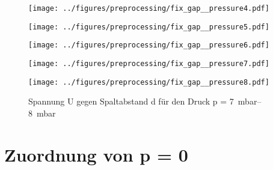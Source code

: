 \begin{figure}[htbp]
    \begin{minipage}[t]{0.3\textwidth}
        \centering
        \texttt{[image: ../figures/preprocessing/fix\_gap\_\_pressure4.pdf]}
        \caption{Spannung U gegen Spaltabstand d für den Druck p = \SIrange{3}{4}{\milli\bar}}
        \label{fig:fix_gap_p3}
    \end{minipage}\hfill
    \begin{minipage}[t]{0.3\textwidth}
        \centering
        \texttt{[image: ../figures/preprocessing/fix\_gap\_\_pressure5.pdf]}
        \caption{Spannung U gegen Spaltabstand d für den Druck p = \SIrange{4}{5}{\milli\bar}}
        \label{fig:fix_gap_p4}
    \end{minipage}\hfill
    \begin{minipage}[t]{0.3\textwidth}
        \centering
        \texttt{[image: ../figures/preprocessing/fix\_gap\_\_pressure6.pdf]}
        \caption{Spannung U gegen Spaltabstand d für den Druck p = \SIrange{5}{6}{\milli\bar}}
        \label{fig:fix_gap_p5}
    \end{minipage}

    \begin{minipage}[t]{0.3\textwidth}
        \centering
        \texttt{[image: ../figures/preprocessing/fix\_gap\_\_pressure7.pdf]}
        \caption{Spannung U gegen Spaltabstand d für den Druck p = \SIrange{6}{7}{\milli\bar}}
        \label{fig:fix_gap_p6}
    \end{minipage}\hfill
    \begin{minipage}[t]{0.3\textwidth}
        \centering
        \texttt{[image: ../figures/preprocessing/fix\_gap\_\_pressure8.pdf]}
        \caption{Spannung U gegen Spaltabstand d für den Druck p = \SIrange{7}{8}{\milli\bar}}
        \label{fig:fix_gap_p7}
    \end{minipage}\hfill



    \vspace{0.5em} %
   \end{figure}



\section{Zuordnung von p = 0}
\label{sec:pressurenull}

